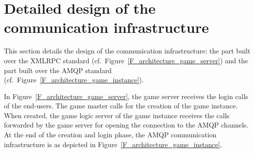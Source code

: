 
\section{Detailed design of the communication infrastructure}
\label{S_detailed_design}

This section details the design of the communication infrastructure:
the part built over the XMLRPC standard
(cf.~Figure~\ref{F_architecture_game_server}) and the part built over
the AMQP standard (cf.~Figure~\ref{F_architecture_game_instance}).

In Figure~\ref{F_architecture_game_server}, the game server receives
the login calls of the end-users. The game master calls for the
creation of the game instance. When created, the game logic server
of the game instance receives the calls forwarded by the game server
for opening the connection to the AMQP channels. At the end of the
creation and login phase, the AMQP communication infrastructure is as
depicted in Figure~\ref{F_architecture_game_instance}.


